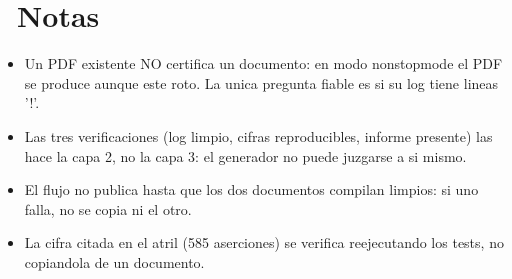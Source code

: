 \documentclass[11pt,a4paper]{article}
\newcommand{\iconotexto}[2]{\textcolor{cyanNeon}{\faIcon{#1}}~#2}
\begin{document}
\section{\iconotexto{sticky-note}{Notas}}
\begin{itemize}
\item Un PDF existente NO certifica un documento: en modo nonstopmode el PDF se produce aunque este roto. La unica pregunta fiable es si su log tiene lineas '!'.
\item Las tres verificaciones (log limpio, cifras reproducibles, informe presente) las hace la capa 2, no la capa 3: el generador no puede juzgarse a si mismo.
\item El flujo no publica hasta que los dos documentos compilan limpios: si uno falla, no se copia ni el otro.
\item La cifra citada en el atril (585 aserciones) se verifica reejecutando los tests, no copiandola de un documento.
\end{itemize}

\end{document}
